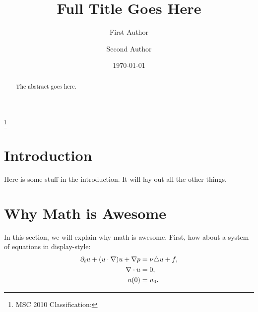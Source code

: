 

\setcounter{my_counter}{1} %

\title[Short Version of Tile]{Full Title Goes Here}

\date{\today}

\thanks{MSC 2010 Classification: }

\author{First Author}
%
\author{Second Author}
%


\thispagestyle{empty} %

\begin{abstract}
The abstract goes here. 
\end{abstract}
   
\maketitle
   
\section{Introduction}\label{sec:intro}

Here is some stuff in the introduction.  It will lay out all the other things.

\section{Why Math is Awesome}\label{sec:awesome}

In this section, we will explain why math is awesome.  First, how about a system of equations in display-style:
\begin{subequations}\label{Navier_Stokes}
\begin{align}
\label{momentum_equation}
 \partial_t u +(u\cdot\nabla)u+\nabla p &= \nu\triangle u +f,
\\
\label{MHD_div}
 \nabla\cdot u &= 0,
\\
\notag
 u(0) &= u_0.
\end{align}
\end{subequations}

